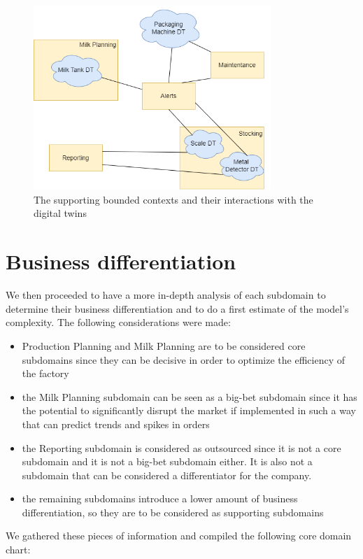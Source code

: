 \begin{figure}[H]
    \centering
    \includegraphics[width=0.8\textwidth]{img/subdomains-dt.png}
    \caption{The supporting bounded contexts and their interactions with the digital twins}
    \label{img:subdomains-dt}
\end{figure}

\section{Business differentiation}
We then proceeded to have a more in-depth analysis of each subdomain to determine their business differentiation and to do a first estimate of the model's complexity. The following considerations were made:
\begin{itemize}
    \item Production Planning and Milk Planning are to be considered core subdomains since they can be decisive in order to optimize the efficiency of the factory
    \item the Milk Planning subdomain can be seen as a big-bet subdomain since it has the potential to significantly disrupt the market if implemented in such a way that can predict trends and spikes in orders
    \item the Reporting subdomain is considered as outsourced since it is not a core subdomain and it is not a big-bet subdomain either. It is also not a subdomain that can be considered a differentiator for the company.
    \item the remaining subdomains introduce a lower amount of business differentiation, so they are to be considered as supporting subdomains
\end{itemize}

We gathered these pieces of information and compiled the following core domain chart:

